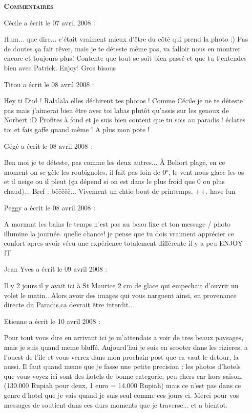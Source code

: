 \bigskip
\textbf{\textsc{Commentaires}}

 \medskip
Cécile a écrit le 07 avril 2008 :
\begin{displayquote}
Hum... que dire... c'était vraiment mieux d'être du côté qui prend la photo :) Pas de doutes ça fait rêver, mais je te déteste même pas, va falloir nous en montrer encore et toujours plus!
Contente que tout se soit bien passé et que tu t'entendes bien avec Patrick. Enjoy!
Gros bisous
\end{displayquote}

 \medskip
Titou a écrit le 08 avril 2008 :
\begin{displayquote}
Hey ti Dud !
Ralalala elles déchirent tes photos ! Comme Cécile je ne te déteste pas mais j'aimerai bien être avec toi labas plutôt qu'assis sur les genoux de Norbert :D
Profites à fond et je suis bien content que tu sois au paradis ! éclates toi et fais gaffe quand même !
A plus mon pote !
\end{displayquote}

 \medskip
Gégé a écrit le 08 avril 2008 :
\begin{displayquote}
Ben moi je te déteste, pas comme les deux autres...
À Belfort plage, en ce moment on se gèle les roubignoles, il fait pas loin de 0°, le vent nous glace les os et il neige ou il pleut (ça dépend si on est dans le plus froid que 0 ou plus chaud)... Bref : bêêêêê...
Vivement un chtio bout de printemps.
++, have fun
\end{displayquote}

 \medskip
Peggy a écrit le 08 avril 2008 :
\begin{displayquote}
A mornant les bains le temps n'est pas au beau fixe et ton message / photo illumine la journée.
quelle chance! 
je pense que tu dois vraiment apprécier ce confort apres avoir vécu une expérience totalement différente il y a peu
ENJOY IT
\end{displayquote}

 \medskip
Jean Yves  a écrit le 09 avril 2008 :
\begin{displayquote}
Il y 2 jours il y avait ici à St Maurice 2 cm de glace qui empechait d'ouvrir un volet le matin...Alors avoir des images qui vous narguent ainsi, en provenance directe du Paradis,ca devrait être interdit...
\end{displayquote}

 \medskip
Etienne a écrit le 10 avril 2008 :
\begin{displayquote}
Pour tout vous dire en arrivant ici je m'attendais a voir de tres beaux paysages, mais je suis quand meme bluffé.
Aujourd'hui je suis en scooter dans les rizieres, a l'ouest de l'ile et vous verrez dans mon prochain post que ca vaut le detour, la aussi.
Il faut quand meme que je fasse une petite precision : les photos d'hotels que vous voyez ici sont des hotels de bonne categorie, peu chers car hors saison, (130.000 Rupiah pour deux, 1 euro = 14.000 Rupiah) mais ce n'est pas dans ce genre d'hotel que je vais quand je suis seul comme ces jours ci.
Merci pour vos messages de soutient dans ces durs moments que je traverse... et a bientot.
\end{displayquote}

